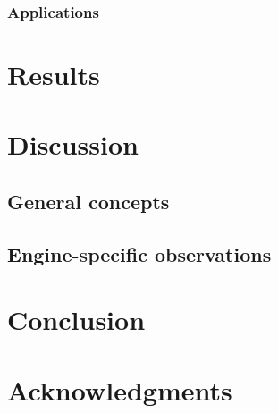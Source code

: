\documentclass{IEEEtran}
\begin{document}

\subsubsection{Applications} %








\section{Results} %



\section{Discussion} %

\subsection{General concepts}






\subsection{Engine-specific observations}

\section{Conclusion} %



\section{Acknowledgments}


 

\end{document}
